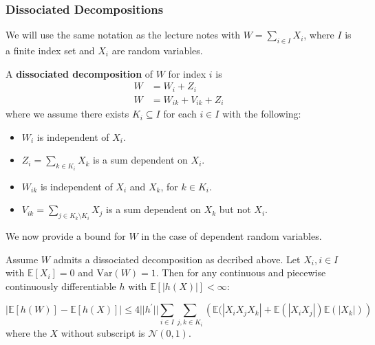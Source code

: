 \documentclass{article}
\begin{document}
\subsubsection{Dissociated Decompositions}
We will use the same notation as the lecture notes with $W=\sum_{i\in I} X_i$, where $I$ is a finite index set and $X_i$ are random variables.

\begin{definition}\label{def:dissociated_decomposition}
    A \textbf{dissociated decomposition} of $W$ for index $i$ is 
    \begin{align*}
        W &= W_i + Z_i \\
        W &= W_{ik} + V_{ik} + Z_i
    \end{align*}
    where we assume there exists $K_i\subseteq I$ for each $i\in I$ with the following:
    \begin{itemize}
        \item $W_i$ is independent of $X_i$.
        \item $Z_i=\sum_{k\in K_i} X_k$ is a sum dependent on $X_i$.
        \item $W_{ik}$ is independent of $X_i$ and $X_k$, for $k\in K_i$.
        \item $V_{ik}=\sum_{j \in K_k\setminus K_i} X_j$ is a sum dependent on $X_k$ but not $X_i$.
    \end{itemize}
\end{definition}

We now provide a bound for $W$ in the case of dependent random variables.

\begin{theorem}\label{thm:stein_equation_normal_dependent}
    Assume $W$ admits a dissociated decomposition as decribed above. Let $X_i, i\in I$ with $\mathbb{E}[X_i]=0$ and $\mathrm{Var}(W)=1$. Then for any continuous and piecewise continuously differentiable $h$ with $\mathbb{E}[|h(X)|]<\infty$:

    \begin{equation*}
        \left|\mathbb{E}[h(W)] - \mathbb{E}[h(X)]\right| \leq 4||h^{\prime}||\sum_{i\in I}\sum_{j,k\in K_{i}}\left(\mathbb{E}(|X_{i}X_{j}X_{k}|+\mathbb{E}(|X_{i}X_{j}|)\mathbb{E}(|X_{k}|)\right)
    \end{equation*}
    where the $X$ without subscript is $\mathcal{N}(0,1)$.  
\end{theorem}
\end{document}
